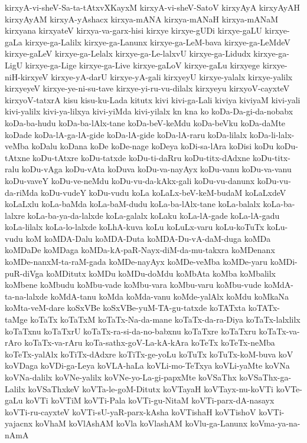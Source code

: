 {kirxyA-vi-sheV-Sa-ta-tAtxvXKayxM
kirxyA-vi-sheV-SatoV
kirxyAyA
kirxyAyAH
kirxyAyAM
kirxyA-yAshacx
kirxya-mANA
kirxya-mANaH
kirxya-mANaM
kirxyana
kirxyateV
kirxya-va-garx-hisi
kirxye
kirxye-gUDi
kirxye-gaLU
kirxye-gaLa
kirxye-ga-Lalilx
kirxye-ga-Lanunx
kirxye-ga-LeM-bava
kirxye-ga-LeMdeV
kirxye-gaLeV
kirxye-ga-Lelalx
kirxye-ga-Le-lalxvU
kirxye-ga-Lidudx
kirxye-ga-LigU
kirxye-ga-Lige
kirxye-ga-Live
kirxye-gaLoV
kirxye-gaLu
kirxyege
kirxye-niH-kirxyeV
kirxye-yA-darU
kirxye-yA-gali
kirxyeyU
kirxye-yalalx
kirxye-yalilx
kirxyeyeV
kirxye-ye-ni-su-tave
kirxye-yi-ru-vu-dilalx
kirxyeyu
kirxyoV-cayxteV
kirxyoV-tatxrA
kisu
kisu-ku-Lada
kitutx
kivi
kivi-ga-Lali
kiviya
kiviyaM
kivi-yali
kivi-yalilx
kivi-ya-lilxya
kivi-yiMda
kivi-yilalx
kn
kna
ko
koDa-Da-gi-da-nobabx
koDa-ba-hudu
koDa-ba-lAlx-tane
koDa-beV-keMdu
koDa-beVku
koDa-daMte
koDade
koDa-lA-ga-lA-gide
koDa-lA-gide
koDa-lA-raru
koDa-lilalx
koDa-li-lalx-veMba
koDalu
koDana
koDe
koDe-nage
koDeya
koDi-sa-lAra
koDisi
koDu
koDu-tAtxne
koDu-tAtxre
koDu-tatxde
koDu-ti-daRru
koDu-titx-dAdxne
koDu-titx-ralu
koDu-vAga
koDu-vAta
koDuva
koDu-va-nayAyx
koDu-vanu
koDu-va-vanu
koDu-vaveY
koDu-ve-neMdu
koDu-vu-da-kAkx-gali
koDu-vu-danunx
koDu-vu-da-riMda
koDu-vudeY
koDu-vudu
koLa
koLaLx-beV-keM-budaM
koLaLxdeV
koLaLxlu
koLa-baMda
koLa-baM-dudu
koLa-ba-lAlx-tane
koLa-balalx
koLa-ba-lalxre
koLa-ba-ya-da-lalxde
koLa-galalx
koLaku
koLa-lA-gade
koLa-lA-gadu
koLa-lilalx
koLa-lo-lalxde
koLhA-kuva
koLu
koLuLx-varu
koLu-koTuTx
koLu-vudu
koM
koMDA-Dalu
koMDA-Duta
koMDA-Du-vA-daM-duga
koMDa
koMDaDe
koMDaga
koMDa-kA-paR-Nayx-diM-da-mu-takxra
koMDenanx
koMDe-nanxM-ta-raM-gada
koMDe-nayAyx
koMDe-veMba
koMDe-yaru
koMDi-puR-diVga
koMDitutx
koMDu
koMDu-doMdu
koMbAta
koMba
koMbalilx
koMbene
koMbudu
koMbu-vade
koMbu-vara
koMbu-varu
koMbu-vude
koMdA-ta-na-lalxde
koMdA-tanu
koMda
koMda-vanu
koMde-yalAlx
koMdu
koMkaNa
koMta-veM-dare
koSxVBe
koSxVBe-yuM-TA-gu-tatxde
koTATxta
koTATx-taMge
koTaTx
koTaTxM
koTaTx-Na-da-mane
koTaTx-da-ra-Diya
koTaTx-lalxlilx
koTaTxnu
koTaTxrU
koTaTx-ra-si-da-no-babxnu
koTaTxre
koTaTxru
koTaTx-va-rAro
koTaTx-va-rAru
koTa-sathx-goV-La-kA-kAra
koTeTx
koTeTx-neMba
koTeTx-yalAlx
koTiTx-dAdxre
koTiTx-ge-yoLu
koTuTx
koTuTx-koM-buva
koV
koVDaga
koVDi-ga-Leya
koVLA-haLa
koVLi-mo-TeTxya
koVLi-yaMte
koVNa
koVNa-dalilx
koVNe-yalilx
koVNe-yo-La-gi-papxMte
koVSaThx
koVSaThx-ga-Lalilx
koVSaThxkeV
koVTa-le-goM-Ditutx
koVTayaH
koVTayx-nu-koVTi
koVTe-gaLu
koVTi
koVTiM
koVTi-Pala
koVTi-gu-NitaM
koVTi-parx-dA-nasayx
koVTi-ru-cayxteV
koVTi-sU-yaR-parx-kAsha
koVTishaH
koVTishoV
koVTi-yajacnx
koVhaM
koVlAshAM
koVla
koVlashAM
koVlu-ga-Lanunx
koVma-ya-na-nAmA
}
